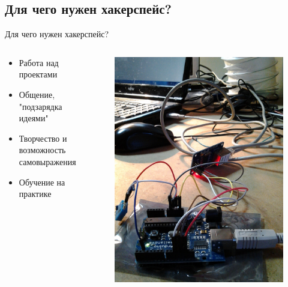 \documentclass[presentation]{beamer}
\begin{document}
\subsection{Для чего нужен хакерспейс?}

\label{sec-1-2}
\begin{frame}[label=sec-1-2-1]{Для чего нужен хакерспейс?}
  \begin{columns}
    \begin{column}{0.5\textwidth}
      \begin{itemize}
      \item \alert{Работа} над проектами
      \item \alert{Общение}, "подзарядка идеями"
      \item \alert{Творчество} и возможность самовыражения
      \item \alert{Обучение} на практике
      \end{itemize}
    \end{column}
    \begin{column}{0.5\textwidth}
      \begin{figure}[r]
        \includegraphics[width=.9\textwidth]{IMG_20150307_174539}
      \end{figure}
    \end{column}
  \end{columns}
\end{frame}
\end{document}
